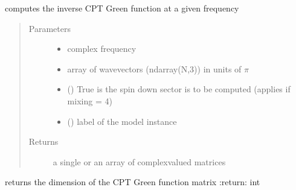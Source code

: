 \documentclass[letterpaper,10pt,english]{sphinxmanual}
\begin{document}
\begin{fulllineitems}
\label{\detokenize{functions:pyqcm.CPT_Green_function_inverse}}
\sphinxAtStartPar
computes the inverse CPT Green function at a given frequency
\begin{quote}\begin{description}
\item[{Parameters}] \leavevmode\begin{itemize}
\item {} 
\sphinxAtStartPar
{} \textendash{} complex frequency

\item {} 
\sphinxAtStartPar
{} \textendash{} array of wavevectors (ndarray(N,3)) in units of \(\pi\)

\item {} 
\sphinxAtStartPar
{} () \textendash{} True is the spin down sector is to be computed (applies if mixing = 4)

\item {} 
\sphinxAtStartPar
{} () \textendash{} label of the model instance

\end{itemize}

\item[{Returns}] \leavevmode
\sphinxAtStartPar
a single or an array of complex\sphinxhyphen{}valued matrices

\end{description}\end{quote}

\end{fulllineitems}


\begin{fulllineitems}
\label{\detokenize{functions:pyqcm.Green_function_dimension}}
\sphinxAtStartPar
returns the dimension of the CPT Green function matrix
:return: int

\end{fulllineitems}
\end{document}
